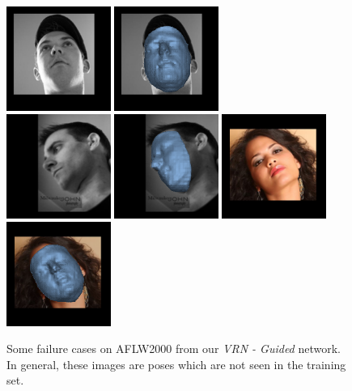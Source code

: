 \begin{figure}
\includegraphics[width=3.4cm]{img/failures/image01038_img.png}
\includegraphics[width=3.4cm]{img/failures/image01038_vol.png}  \\ [0.5mm]
\includegraphics[width=3.4cm]{img/failures/image01624_img.png}
\includegraphics[width=3.4cm]{img/failures/image01624_vol.png} \hspace{2mm}
\includegraphics[width=3.4cm]{img/failures/image02026_img.png}
\includegraphics[width=3.4cm]{img/failures/image02026_vol.png}
\caption[Some very difficult failure cases]{Some failure cases on
  AFLW2000 from our \textit{VRN - Guided} network. In general, these
  images are poses which are not seen in the training set.}
\label{fig:facefailure}
\end{figure}

